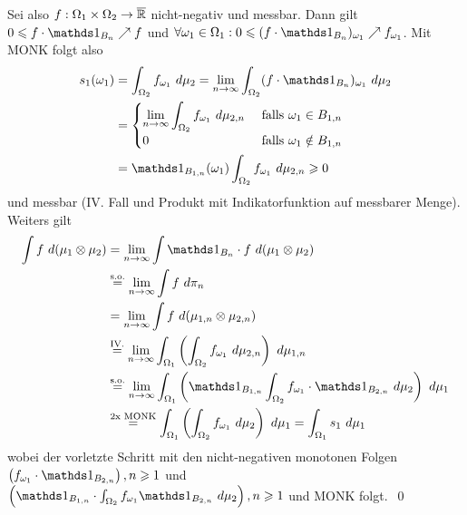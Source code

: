     Sei also $f:\Omega_1\times\Omega_2\to\overline{\mathbb{R}}$ nicht-negativ und messbar. Dann gilt $0\leq f\cdot\ind{B_n}\nearrow f$ und $\forall\omega_1\in\Omega_1:0\leq(f\cdot\ind{B_n})_{\omega_1}\nearrow f_{\omega_1}$. Mit MONK folgt also
    \begin{align*}
        s_1(\omega_1)&=\int_{\Omega_2}f_{\omega_1}\ d\mu_2=\lim_{n\to\infty}\int_{\Omega_2}(f\cdot\ind{B_n})_{\omega_1}\ d\mu_2\\
        &=\begin{cases}
            \displaystyle\lim_{n\to\infty}\int_{\Omega_2}f_{\omega_1}\ d\mu_{2,n}&\text{ falls }\omega_1\in B_{1,n}\\
            0&\text{ falls }\omega_1\notin B_{1,n}
        \end{cases}
        \\ &=\ind{B_{1,n}}(\omega_1)\int_{\Omega_2}f_{\omega_1}\ d\mu_{2,n}\geq0
    \end{align*}
    und messbar (IV. Fall und Produkt mit Indikatorfunktion auf messbarer Menge). Weiters gilt
    \begin{align*}
        \int f\ d(\mu_1\otimes\mu_2)&=\lim_{n\to\infty}\int\ind{B_n}\cdot f\ d(\mu_1\otimes\mu_2)\\
        &\overset{\text{s.o.}}{=}\lim_{n\to\infty}\int f\ d\pi_n\\
        &=\lim_{n\to\infty}\int f\ d(\mu_{1,n}\otimes\mu_{2,n})\\
        &\overset{\text{IV.}}{=}\lim_{n\to\infty}\int_{\Omega_1}\left(\int_{\Omega_2} f_{\omega_1}\ d\mu_{2,n}\right)\ d\mu_{1,n}\\
        &\overset{\text{s.o.}}{=}\lim_{n\to\infty}\int_{\Omega_1}\left(\ind{B_{1,n}}\int_{\Omega_2}f_{\omega_1}\cdot\ind{B_{2,n}}\ d\mu_2\right)\ d\mu_1 \\
        &\overset{\text{2x MONK}}{=}\int_{\Omega_1}\left(\int_{\Omega_2}f_{\omega_1}\ d\mu_2\right)\ d\mu_1=\int_{\Omega_1}s_1\ d\mu_1
    \end{align*}
    wobei der vorletzte Schritt mit den nicht-negativen monotonen Folgen $\left(f_{\omega_1}\cdot\ind{B_{2,n}}\right),n\geq1$ und 
    $\left(\ind{B_{1,n}}\cdot\int_{\Omega_2}f_{\omega_1}\ind{B_{2,n}}\ d\mu_2\right),n\geq1$
    und MONK folgt. \qed
    
